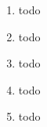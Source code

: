 \documentclass{article}
\begin{document}
\setlength{\parskip}{1em}
\lstset{showstringspaces=false}

\begin{enumerate}
	\item
	
	todo
	
	\item
	
	todo
	
	\item
	
	todo
	
	\item
	
	todo
	
	\item
	
	todo
	
\end{enumerate}
\end{document}
